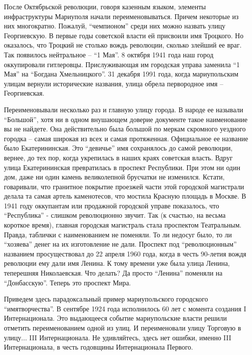 После Октябрьской революции, говоря казенным языком, элементы инфраструктуры
Мариуполя начали переименовываться. Причем некоторые из них многократно.
Пожалуй, \enquote{чемпионом} среди них можно назвать улицу Георгиевскую. В первые годы
советской власти ей присвоили имя Троцкого. Но оказалось, что Троцкий не
столько вождь революции, сколько злейший ее враг. Так появилось нейтральное –
\enquote{1 Мая}. 8 октября 1941 года наш город оккупировали гитлеровцы. Прислуживающая
им городская управа заменила \enquote{1 Мая} на \enquote{Богдана Хмельницкого}. 31 декабря 1991
года, когда  мариупольским улицам вернули исторические названия, улица обрела
первородное имя – Георгиевская.

Переименовывали несколько раз и главную улицу города. В народе ее называли
\enquote{Большой}, хотя ни в одном внушающем доверие документе такое
наименование вы не найдете. Она действительно была большой по меркам скромного
уездного городка – самая широкая из всех и самая протяженная. Официальное ее
название было Екатерининская. Это \enquote{девичье} имя сохранялось до самой
революции, вернее, до тех пор, когда укрепилась в наших краях советская власть.
Вдруг улица Екатерининская превратилась в проспект Республики. При этом ни один
дом, даже ни один камень великолепной брусчатки не изменился. Кстати,
говаривали, что гранитное покрытие проезжей части этой городской магистрали
делала та самая артель каменотесов, что мостила Красную площадь в Москве. В
1941 году оккупантам или продажной городской управе показалось, что
\enquote{Республика} - слишком революционно звучит. Так (к счастью, на весьма
короткое время), главная городская магистраль стала проспектом  Театральным.
Правда, таблички с наименованием не поменяли. То ли недосуг было, то ли
\enquote{хозяева} денег на их изготовление не дали. Проспект под
\enquote{революционным} названием просуществовал до 22 апреля 1960 года, когда
в честь 90-летия вождя революции ему дали имя Ленина. К тому времени уже была
улица Ленина, теперешняя Николаевская. Что делать? Да просто \enquote{Ленина}
поменяли на \enquote{Донбасскую}. Теперь это проспект Мира.

Приведем здесь парадоксальный пример мариупольского городского \enquote{имятворчества}.
В сентябре 1924 года исполнилось 60 лет с момента создания I Интернационала.
Это выдающееся событие мариупольские власти решили отметить переименованием
одной из улиц. И переименовали улицу Торговую в улицу... III Интернационала. Не
удивляйтесь, здесь нет ошибки, именно III Интернационала, в честь годовщины
Интернационала Первого.

